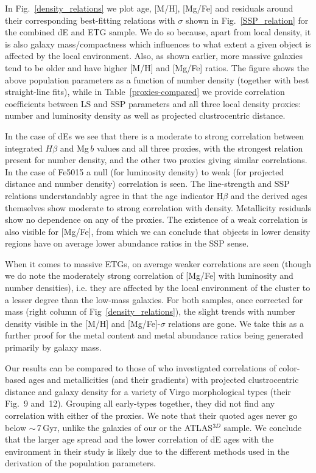 \documentclass[useAMS,usenatbib]{mn2e}
\newcommand{\hb}{H$\beta$}
\newcommand{\sig}{$\sigma$}
\newcommand{\mgb}{Mg\,$b$}
\begin{document}
In Fig.~\ref{density_relations} we plot age, [M/H], [Mg/Fe] and residuals around their corresponding best-fitting relations with {\sig} shown in Fig.~\ref{SSP_relation} for the combined dE and ETG sample. We do so because, apart from local density, it is also galaxy mass/compactness which influences to what extent a given object is affected by the local environment. Also, as shown earlier, more massive galaxies tend to be older and have higher [M/H] and [Mg/Fe] ratios. The figure shows the above population parameters as a function of number density (together with best straight-line fits), while in Table~\ref{proxies-compared} we provide correlation coefficients between LS and SSP parameters and all three local density proxies: number and luminosity density as well as projected clustrocentric distance.

In the case of dEs we see that there is a moderate to strong correlation between integrated $H\beta$ and {\mgb} values and all three proxies, with the strongest relation present for number density, and the other two proxies giving similar correlations. In the case of Fe5015 a null (for luminosity density) to weak (for projected distance and number density) correlation is seen. The line-strength and SSP relations understandably agree in that the age indicator {\hb} and the derived ages themselves show moderate to strong correlation with density. Metallicity residuals show no dependence on any of the proxies. The existence of a weak correlation is also visible for [Mg/Fe], from which we can conclude that objects in lower density regions have on average lower abundance ratios in the SSP sense. 

When it comes to massive ETGs, on average weaker correlations are seen (though we do note the moderately strong correlation of [Mg/Fe] with luminosity and number densities), i.e. they are affected by the local environment of the cluster to a lesser degree than the low-mass galaxies. For both samples, once corrected for mass (right column of Fig~\ref{density_relations}), the slight trends with number density visible in the [M/H] and [Mg/Fe]-{\sig} relations are gone. We take this as a further proof for the metal content and metal abundance ratios being generated primarily by galaxy mass.

Our results can be compared to those of \cite{roediger:2011b} who investigated correlations of color-based ages and metallicities (and their gradients) with projected clustrocentric distance and galaxy density for a variety of Virgo morphological types (their Fig.~9 and~12). Grouping all early-types together, they did not find any correlation with either of the proxies. We note that their quoted ages never go below $\sim$\,7\,Gyr, unlike the galaxies of our or the ATLAS$^{3D}$ sample. We conclude that the larger age spread and the lower correlation of dE ages with the environment in their study is likely due to the different methods used in the derivation of the population parameters. 
\end{document}
